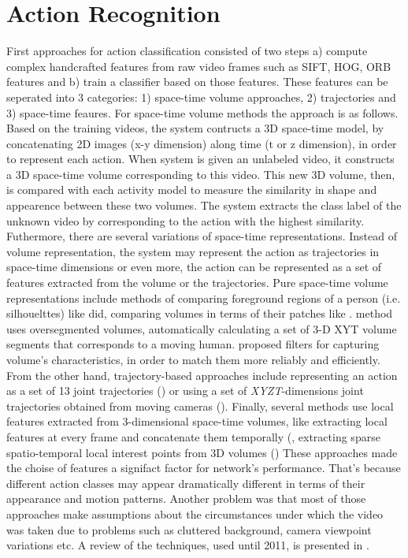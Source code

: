 \documentclass{report}
\begin{document}
\section{Action Recognition}
First approaches for action classification consisted of two steps a) compute complex handcrafted features from raw video frames
such as SIFT, HOG, ORB features and b) train a classifier based on those features. These features can be seperated into 3 categories:
1) space-time volume approaches, 2) trajectories and 3) space-time feaures. For space-time volume methods the approach is as follows. Based on the training videos, the system contructs a 3D space-time model, by concatenating 2D images (x-y dimension) along time (t or z dimension),
in order to represent each action. When system is given an unlabeled video, it constructs a 3D space-time volume corresponding to this video.
This new 3D volume, then, is compared with each activity model to measure the similarity in shape and appearence between these two volumes.
The system extracts the class label of the unknown video by corresponding to the action with the highest similarity. Futhermore, there are
several variations of space-time representations. Instead of volume representation, the system may represent the action as trajectories
in space-time dimensions  or even more, the action can be represented as a set of features extracted from the volume or the trajectories.
Pure space-time volume representations include methods of comparing foreground regions of a person (i.e. silhouelttes) like \cite{BobickAaron}
did, comparing volumes in terms of their patches like \cite{1467296}.  \cite{4270510} method uses oversegmented volumes, automatically
calculating a set of 3-D XYT volume segments that corresponds to a moving human. \cite{4587727} proposed filters for
capturing volume's characteristics, in order to match them more reliably and efficiently. From the other hand, trajectory-based approaches
include representing an action as a set of 13 joint trajectories (\cite{1541250}) or using a set of \textit{XYZT}-dimensions joint trajectories
obtained from moving cameras (\cite{1541251}). Finally, several methods use local features extracted from 3-dimensional space-time volumes,
like extracting local features at every frame and concatenate them temporally (\cite{784616, 990935, 1544882}, extracting sparse
spatio-temporal local interest points from 3D volumes (\cite{1238378, 1570899, Niebles, 1467373, Ryoo2006})
These approaches made the choise of
features a signifact factor for network's performance. That's because different action classes may appear dramatically
different in terms of their appearance and motion patterns. Another problem was that most of those approaches make
assumptions about the circumstances under which the video was taken due to problems such as cluttered
background, camera viewpoint variations etc. A review of the techniques, used until 2011, is presented in \cite{Aggarwal:2011:HAA:1922649.1922653}. \par
\end{document}

